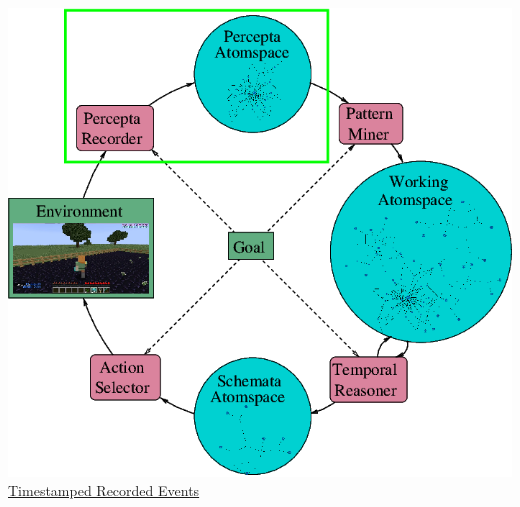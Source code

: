 \documentclass[aspectratio=169]{beamer}
\begin{document}
\begin{frame}


  \begin{columns}
    \column{3.2in}
    \includegraphics[scale=0.3]{pictures/rocca-chart-perception-highlight-v0.7.png}
    \column{2.5in}
    \underline{Timestamped Recorded Events}


\end{columns}
\end{frame}
\end{document}
